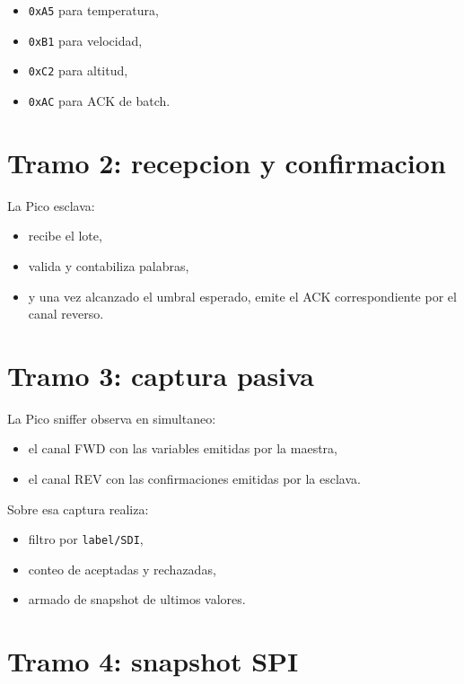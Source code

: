 \documentclass[12pt,a4paper]{report}
\begin{document}
\begin{itemize}
    \item \texttt{0xA5} para temperatura,
    \item \texttt{0xB1} para velocidad,
    \item \texttt{0xC2} para altitud,
    \item \texttt{0xAC} para ACK de batch.
\end{itemize}

\section{Tramo 2: recepcion y confirmacion}

La Pico esclava:

\begin{itemize}
    \item recibe el lote,
    \item valida y contabiliza palabras,
    \item y una vez alcanzado el umbral esperado, emite el ACK correspondiente por el canal reverso.
\end{itemize}

\section{Tramo 3: captura pasiva}

La Pico sniffer observa en simultaneo:

\begin{itemize}
    \item el canal FWD con las variables emitidas por la maestra,
    \item el canal REV con las confirmaciones emitidas por la esclava.
\end{itemize}

Sobre esa captura realiza:

\begin{itemize}
    \item filtro por \texttt{label/SDI},
    \item conteo de aceptadas y rechazadas,
    \item armado de snapshot de ultimos valores.
\end{itemize}

\section{Tramo 4: snapshot SPI}
\end{document}
